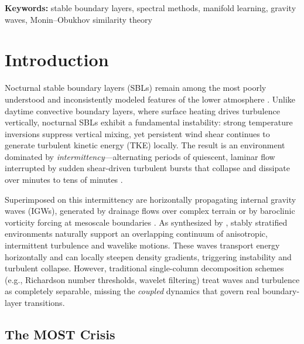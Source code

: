 \documentclass[11pt,a4paper]{article}
\begin{document}
\noindent \textbf{Keywords:} stable boundary layers, spectral methods, manifold learning, gravity waves, Monin--Obukhov similarity theory

\newpage
\tableofcontents
\newpage

\section{Introduction}
\label{sec:intro}

Nocturnal stable boundary layers (SBLs) remain among the most poorly understood and inconsistently modeled features of the lower atmosphere \citep{Mahrt2014, Acevedo2016}. Unlike daytime convective boundary layers, where surface heating drives turbulence vertically, nocturnal SBLs exhibit a fundamental instability: strong temperature inversions suppress vertical mixing, yet persistent wind shear continues to generate turbulent kinetic energy (TKE) locally. The result is an environment dominated by \emph{intermittency}---alternating periods of quiescent, laminar flow interrupted by sudden shear-driven turbulent bursts that collapse and dissipate over minutes to tens of minutes \citep{Mahrt1999, Terradellas2001}.

Superimposed on this intermittency are horizontally propagating internal gravity waves (IGWs), generated by drainage flows over complex terrain or by baroclinic vorticity forcing at mesoscale boundaries \citep{Vosper2006, Sun2015}. As synthesized by \citet{Sun2015}, stably stratified environments naturally support an overlapping continuum of anisotropic, intermittent turbulence and wavelike motions. These waves transport energy horizontally and can locally steepen density gradients, triggering instability and turbulent collapse. However, traditional single-column decomposition schemes (e.g., Richardson number thresholds, wavelet filtering) treat waves and turbulence as completely separable, missing the \emph{coupled} dynamics that govern real boundary-layer transitions.

\subsection{The MOST Crisis}
\end{document}
